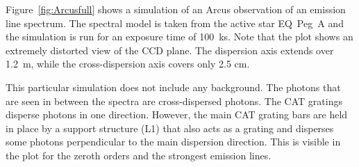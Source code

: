 \documentclass[twocolumn]{aastex631}
\begin{document}
Figure~\ref{fig:Arcusfull} shows a simulation of an Arcus observation of an emission line spectrum. The spectral model is taken from the active star EQ~Peg~A \citep{2008A&A...491..859L} and the simulation is run for an exposure time of 100~ks. Note that the plot shows an extremely distorted view of the CCD plane. The dispersion axis extends over 1.2~m, while the cross-dispersion axis covers only 2.5 cm.

This particular simulation does not include any background. The photons that are seen in between the spectra are cross-dispersed photons. The CAT gratings disperse photons in one direction. However, the main CAT grating bars are held in place by a support structure (L1) that also acts as a grating and disperses some photons perpendicular to the main dispersion direction. This is visible in the plot for the zeroth orders and the strongest emission lines.







\end{document}
